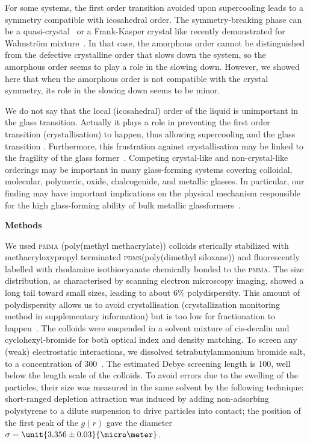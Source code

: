 For some systems, the first order transition avoided upon supercooling leads to a symmetry compatible with icosahedral order. The symmetry-breaking phase can be a quasi-crystal~\citep{Doye2003} or a Frank-Kasper crystal like recently demonstrated for Wahnstr\"om mixture~\citep{Pedersen2010}. In that case, the amorphous order cannot be distinguished from the defective crystalline order that slows down the system, so the amorphous order seems to play a role in the slowing down. However, we showed here that when the amorphous order is not compatible with the crystal symmetry, its role in the slowing down seems to be minor.

We do not say that the local (icosahedral) order of the liquid is unimportant in the glass transition. Actually it plays a role in preventing the first order transition (crystallisation) to happen, thus allowing supercooling and the glass transition \cite{TanakaMJPCM}. Furthermore, this frustration against crystallisation may be linked to the fragility of the glass former~\citep{TanakaGJPCM,tanaka2010critical}. Competing crystal-like and non-crystal-like orderings may be important in many glass-forming systems covering colloidal, molecular, polymeric, oxide, chalcogenide, and metallic glasses. In particular, our finding may have important implications on the physical mechanism responsible for the high glass-forming ability of bulk metallic glassformers~\cite{Wang2004}. 

\vspace{1cm}
\noindent
\textbf{Methods}

We used \textsc{pmma} (poly(methyl methacrylate)) colloids sterically stabilized with methacryloxypropyl terminated \textsc{pdms}(poly(dimethyl siloxane)) and fluorescently labelled with rhodamine isothiocyanate chemically bonded to the \textsc{pmma}. The size distribution, as characterised by scanning electron microscopy imaging, showed a long tail toward small sizes, leading to about $6\%$ polydispersity. This amount of polydispersity allows us to avoid crystallisation (crystallization monitoring method in supplementary information) but is too low for fractionation to happen~\citep{Fasolo2003}. The colloids were suspended in a solvent mixture of cis-decalin and cyclohexyl-bromide for both optical index and density matching. To screen any (weak) electrostatic interactions, we dissolved tetrabutylammonium bromide salt, to a concentration of \unit{300}{\nano\mole\per\liter}~\citep{royall2005}. The estimated Debye screening length is \unit{100}{\nano\metre}, well below the length scale of the colloids. To avoid errors due to the swelling of the particles, their size was measured in the same solvent by the following technique: short-ranged depletion attraction was induced by adding non-adsorbing polystyrene to a dilute suspension to drive particles into contact; the position of the first peak of the $g(r)$ gave the diameter $\sigma = \unit{3.356\pm0.03}{\micro\meter}$.

